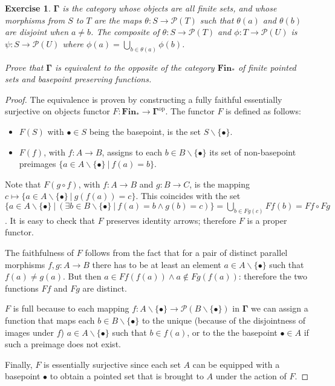 \documentclass[a5paper,oneside,11pt]{article}
\newtheorem{ex}{Exercise}
\newcommand\1{\mathord{\mathrm{1}}}
\newcommand\power[1]{\mathcal{P}(#1)}
\newcommand\cat[1]{\mathbf{#1}}
\newcommand\op{\mathrm{op}}
\begin{document}
\begin{ex}
    $\cat{\Gamma}$ is the category whose objects are all finite sets, and whose morphisms
    from $S$ to $T$ are the maps $\theta : S \rightarrow \power{T}$ such that $\theta(a)$
    and $\theta(b)$ are disjoint when $a \neq b$. The composite of
    $\theta : S \rightarrow \power{T}$ and $\phi : T \rightarrow \power{U}$ is
    $\psi : S \rightarrow \power{U}$ where $\phi(a) = \bigcup_{b \in \theta(a)} \phi(b)$.

    Prove that $\cat{\Gamma}$ is equivalent to the opposite of the category $\cat{Fin_*}$
    of finite pointed sets and basepoint preserving functions.
\end{ex}
\begin{proof}
    The equivalence is proven by constructing a fully faithful essentially surjective on objects
    functor $F : \cat{Fin_*} \longrightarrow \cat{\Gamma}^\op$.
    The functor $F$ is defined as follows:
    \begin{itemize}
        \item $F(S)$ with $\bullet \in S$ being the basepoint, is the set $S \backslash \{\bullet\}$.
        \item $F(f)$, with $f : A \rightarrow B$, assigns to each $b \in B \backslash \{\bullet\}$
            its set of non-basepoint preimages $\{a \in A \backslash \{\bullet\}\ |\ f(a) = b\}$.
    \end{itemize}
    Note that $F(g \circ f)$, with $f : A \rightarrow B$ and $g : B \rightarrow C$, is the mapping
    $c \mapsto \{a \in A \backslash \{\bullet\}\ |\ g(f(a)) = c\}$. This coincides with the set
    $\{a \in A \backslash \{\bullet\}\ |\ (\exists b \in B \backslash \{\bullet\}\ |\ f(a) = b \wedge g(b) = c)\} =
    \bigcup_{b \in Fg(c)} Ff(b) = Ff \circ Fg$.
    It is easy to check that $F$ preserves identity arrows; therefore $F$ is a proper functor.

    The faithfulness of $F$ follows from the fact that for a pair of distinct parallel morphisms
    $f, g : A \rightarrow B$ there has to be at least an element $a \in A \backslash \{\bullet\}$
    such that $f(a) \neq g(a)$. But then $a \in Ff(f(a)) \wedge a \notin Fg(f(a))$: therefore the
    two functions $Ff$ and $Fg$ are distinct.

    $F$ is full because to each mapping $f : A \backslash \{\bullet\} \rightarrow \power{B \backslash \{\bullet\}}$
    in $\cat{\Gamma}$ we can assign a function that maps each $b \in B \backslash \{\bullet\}$ to the unique (because of
    the disjointness of images under $f$) $a \in A \backslash \{\bullet\}$ such that $b \in f(a)$, or to the the basepoint
    $\bullet \in A$ if such a preimage does not exist.

    Finally, $F$ is essentially surjective since each set $A$ can be equipped with a basepoint $\bullet$
    to obtain a pointed set that is brought to $A$ under the action of $F$.
\end{proof}
\end{document}
